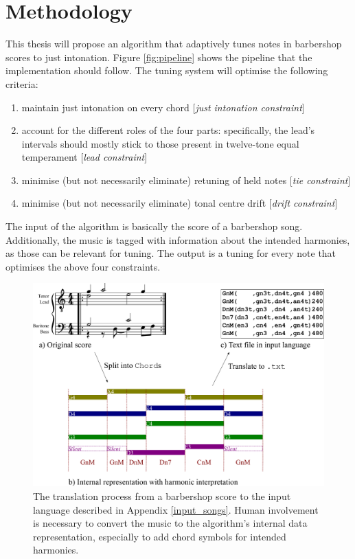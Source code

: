 \documentclass[a4paper]{article}
\begin{document}
\newpage

\section{Methodology}
\label{methodoloy}
This thesis will propose an algorithm that adaptively tunes notes in barbershop scores to just intonation. Figure \ref{fig:pipeline} shows the pipeline that the implementation should follow. The tuning system will optimise the following criteria:
\begin{enumerate}
	\item maintain just intonation on every chord [\textit{just intonation constraint}]
	\item account for the different roles of the four parts: specifically, the lead's intervals should mostly stick to those present in twelve-tone equal temperament [\textit{lead constraint}]
	\item minimise (but not necessarily eliminate) retuning of held notes [\textit{tie constraint}]
	\item minimise (but not necessarily eliminate) tonal centre drift [\textit{drift constraint}]
\end{enumerate}

The input of the algorithm is basically the score of a barbershop song. Additionally, the music is tagged with information about the intended harmonies, as those can be relevant for tuning. The output is a tuning for every note that optimises the above four constraints.

\begin{figure}
	\centering
	\includegraphics[height=0.3\textheight]{Figures/benedettiH.pdf}
	\caption{The translation process from a barbershop score to the input language described in Appendix \ref{input_songs}. Human involvement is necessary to convert the music to the algorithm's internal data representation, especially to add chord symbols for intended harmonies.}
	\label{fig:input}
\end{figure}
\end{document}
